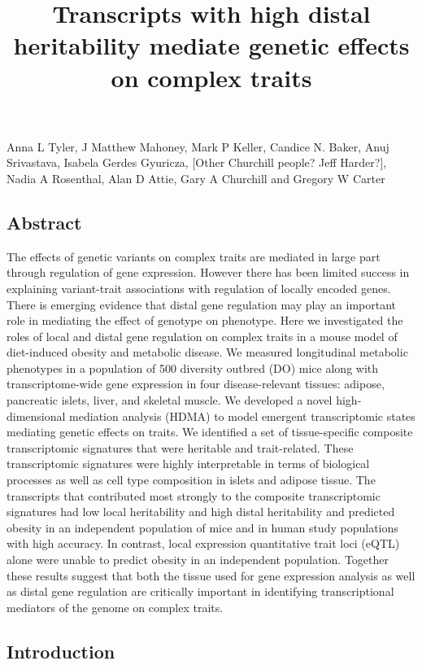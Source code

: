 \documentclass[
]{article}
\title{Transcripts with high distal heritability mediate genetic effects
on complex traits}
\author{}
\date{\vspace{-2.5em}}
\begin{document}
\maketitle

Anna L Tyler, J Matthew Mahoney, Mark P Keller, Candice N. Baker, Anuj
Srivastava, Isabela Gerdes Gyuricza, {[}Other Churchill people? Jeff
Harder?{]}, Nadia A Rosenthal, Alan D Attie, Gary A Churchill and
Gregory W Carter

\subsection{Abstract}\label{abstract}

The effects of genetic variants on complex traits are mediated in large
part through regulation of gene expression. However there has been
limited success in explaining variant-trait associations with regulation
of locally encoded genes. There is emerging evidence that distal gene
regulation may play an important role in mediating the effect of
genotype on phenotype. Here we investigated the roles of local and
distal gene regulation on complex traits in a mouse model of
diet-induced obesity and metabolic disease. We measured longitudinal
metabolic phenotypes in a population of 500 diversity outbred (DO) mice
along with transcriptome-wide gene expression in four disease-relevant
tissues: adipose, pancreatic islets, liver, and skeletal muscle. We
developed a novel high-dimensional mediation analysis (HDMA) to model
emergent transcriptomic states mediating genetic effects on traits. We
identified a set of tissue-specific composite transcriptomic signatures
that were heritable and trait-related. These transcriptomic signatures
were highly interpretable in terms of biological processes as well as
cell type composition in islets and adipose tissue. The transcripts that
contributed most strongly to the composite transcriptomic signatures had
low local heritability and high distal heritability and predicted
obesity in an independent population of mice and in human study
populations with high accuracy. In contrast, local expression
quantitative trait loci (eQTL) alone were unable to predict obesity in
an independent population. Together these results suggest that both the
tissue used for gene expression analysis as well as distal gene
regulation are critically important in identifying transcriptional
mediators of the genome on complex traits.

\subsection{Introduction}\label{introduction}
\end{document}
